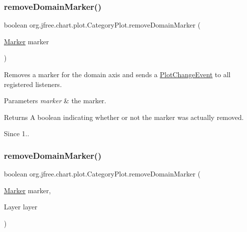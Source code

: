 \subsubsection{\texorpdfstring{remove\+Domain\+Marker()}{removeDomainMarker()}\hspace{0.1cm}{\footnotesize\ttfamily [1/4]}}
{\footnotesize\ttfamily boolean org.\+jfree.\+chart.\+plot.\+Category\+Plot.\+remove\+Domain\+Marker (\begin{DoxyParamCaption}\item[{\mbox{\hyperlink{classorg_1_1jfree_1_1chart_1_1plot_1_1_marker}{Marker}}}]{marker }\end{DoxyParamCaption})}

Removes a marker for the domain axis and sends a \mbox{\hyperlink{}{Plot\+Change\+Event}} to all registered listeners.


\begin{DoxyParams}{Parameters}
{\em marker} & the marker.\\
\hline
\end{DoxyParams}
\begin{DoxyReturn}{Returns}
A boolean indicating whether or not the marker was actually removed.
\end{DoxyReturn}
\begin{DoxySince}{Since}
1.. 
\end{DoxySince}
\mbox{\label{classorg_1_1jfree_1_1chart_1_1plot_1_1_category_plot_a215d9c4db6ebf44f951eb29dac9dcced}} 
\subsubsection{\texorpdfstring{remove\+Domain\+Marker()}{removeDomainMarker()}\hspace{0.1cm}{\footnotesize\ttfamily [2/4]}}
{\footnotesize\ttfamily boolean org.\+jfree.\+chart.\+plot.\+Category\+Plot.\+remove\+Domain\+Marker (\begin{DoxyParamCaption}\item[{\mbox{\hyperlink{classorg_1_1jfree_1_1chart_1_1plot_1_1_marker}{Marker}}}]{marker,  }\item[{Layer}]{layer }\end{DoxyParamCaption})}

